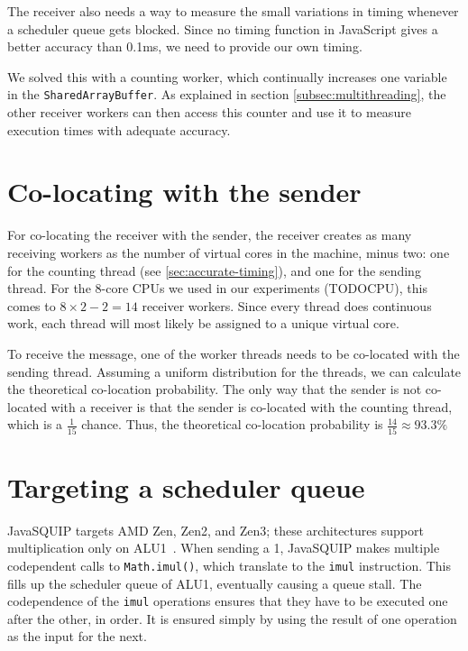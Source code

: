 \documentclass[11pt,
  titlepage=false,
]{scrreprt}
\begin{document}

The receiver also needs a way to measure the small variations in timing whenever a scheduler queue gets blocked.
Since no timing function in JavaScript gives a better accuracy than 0.1ms, we need to provide our own timing.

We solved this with a counting worker, which continually increases one variable in the \texttt{SharedArrayBuffer}.
As explained in section \ref{subsec:multithreading}, the other receiver workers can then access this counter and use it to measure execution times with adequate accuracy.

\section{Co-locating with the sender}
\label{sec:co-location}
For co-locating the receiver with the sender, the receiver creates as many receiving workers as the number of virtual cores in the machine, minus two:
one for the counting thread (see \ref{sec:accurate-timing}), and one for the sending thread.
For the 8-core CPUs we used in our experiments (TODOCPU), this comes to $8 \times 2 - 2 = 14$ receiver workers.
Since every thread does continuous work, each thread will most likely be assigned to a unique virtual core.

To receive the message, one of the worker threads needs to be co-located with the sending thread.
Assuming a uniform distribution for the threads, we can calculate the theoretical co-location probability.
The only way that the sender is not co-located with a receiver is that the sender is co-located with the counting thread,
which is a $\frac{1}{15}$ chance.
Thus, the theoretical co-location probability is $\frac{14}{15} \approx 93.3\%$

\section{Targeting a scheduler queue}
JavaSQUIP targets AMD Zen, Zen2, and Zen3;
these architectures support multiplication only on ALU1~\cite{AMD2020OptimizationEPYC7003}.
When sending a 1, JavaSQUIP makes multiple codependent calls to \texttt{Math.imul()}, which translate to the \texttt{imul} instruction.
This fills up the scheduler queue of ALU1, eventually causing a queue stall.
The codependence of the \texttt{imul} operations ensures that they have to be executed one after the other, in order.
It is ensured simply by using the result of one operation as the input for the next.
\end{document}

